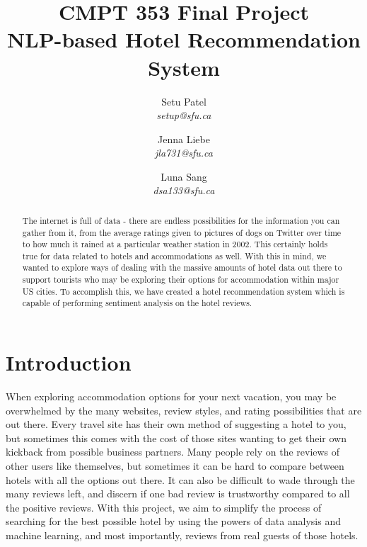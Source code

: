 \documentclass[conference]{IEEEtran}
\begin{document}
	
	\title{CMPT 353 Final Project\\
		NLP-based Hotel Recommendation System}
	\author{Setu Patel\\
		\textit{setup@sfu.ca}
		\and Jenna Liebe\\
		\textit{jla731@sfu.ca}
		\and Luna Sang\\
		\textit{dsa133@sfu.ca}}
	\maketitle
	
	\begin{abstract}
		The internet is full of data - there are endless possibilities for the information you can gather from it, from the average ratings given to pictures of dogs on Twitter over time to how much it rained at a particular weather station in 2002. This certainly holds true for data related to hotels and accommodations as well. With this in mind, we wanted to explore ways of dealing with the massive amounts of hotel data out there to support tourists who may be exploring their options for accommodation within major US cities. To accomplish this, we have created a hotel recommendation system which is capable of performing sentiment analysis on the hotel reviews.
	\end{abstract}
	
	\section{Introduction}
	When exploring accommodation options for your next vacation, you may be overwhelmed by the many websites, review styles, and rating possibilities that are out there. Every travel site has their own method of suggesting a hotel to you, but sometimes this comes with the cost of those sites wanting to get their own kickback from possible business partners. Many people rely on the reviews of other users like themselves, but sometimes it can be hard to compare between hotels with all the options out there. It can also be difficult to wade through the many reviews left, and discern if one bad review is trustworthy compared to all the positive reviews. With this project, we aim to simplify the process of searching for the best possible hotel by using the powers of data analysis and machine learning, and most importantly, reviews from real guests of those hotels.
	
\end{document}
